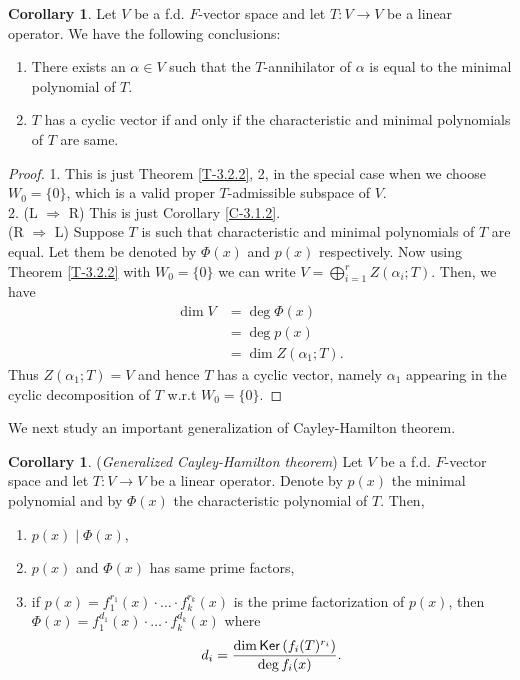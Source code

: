 \documentclass[letterpaper,11pt,twoside]{article}
\theoremstyle{definition}
\theoremstyle{definition}
\theoremstyle{definition}
\theoremstyle{definition}
\theoremstyle{definition}
\theoremstyle{definition}
\theoremstyle{remark}
\theoremstyle{definition}
\newtheorem{corollary}[proposition]{Corollary}
\newcommand{\Ker}[1]{{\fontfamily{lmss}\selectfont 
		\text{Ker}\left (#1\right )
}}
\begin{document}
	\begin{corollary}\label{C-3.2.4}
		Let $ V $ be a f.d. $ F$-vector space and let $ T: V\to V $ be a linear operator. We have the following conclusions:
		\begin{enumerate}
			\item {There exists an $ \alpha\in V $ such that the $ T $-annihilator of $ \alpha $ is equal to the minimal polynomial of $ T $.}
			\item {$ T $ has a cyclic vector if and only if the characteristic and minimal polynomials of $ T $ are same.}
		\end{enumerate}
	\end{corollary}
\begin{proof}
		1. This is just Theorem \ref{T-3.2.2}, 2, in the special case when we choose $ W_0 = \{0\} $, which is a valid proper $ T $-admissible subspace of $ V $.\\
		
		2. (L $ \Rightarrow $ R) This is just Corollary \ref{C-3.1.2}.\\
		(R $ \Rightarrow $ L) Suppose $ T $ is such that characteristic and minimal polynomials of $ T $ are equal. Let them be denoted by $ \Phi(x) $ and $ p(x) $ respectively. Now using Theorem \ref{T-3.2.2} with $ W_0 = \{0\} $ we can write $ V = \bigoplus_{i=1}^{r} Z(\alpha_i;T)  $. Then, we have
		\begin{align*}
			\dim V &= \deg \Phi(x)\\
			&= \deg p(x)\\
			&= \dim Z(\alpha_1;T).
		\end{align*}
		Thus $ Z(\alpha_1;T) = V $ and hence $ T $ has a cyclic vector, namely $ \alpha_1 $ appearing in the cyclic decomposition of $ T $ w.r.t $ W_0 = \{0\} $.
\end{proof}
	We next study an important generalization of Cayley-Hamilton theorem.
	\begin{corollary}\label{C-3.2.6}
		(\textit{Generalized Cayley-Hamilton theorem}) Let $ V $ be a f.d. $ F $-vector space and let $ T: V\to V $ be a linear operator. Denote by $ p(x) $ the minimal polynomial and by $ \Phi (x) $ the characteristic polynomial of $ T $. Then,
		\begin{enumerate}
			\item {$ p(x) \; | \; \Phi(x)$,}
			\item {$ p(x) $ and $ \Phi(x) $ has same prime factors,}
			\item {if $ p(x)  = f_1^{r_1}(x)\cdot \dots \cdot f_k^{r_k}(x)$ is the prime factorization of $ p(x) $, then $ \Phi(x) = f_{1}^{d_1}(x) \cdot \dots \cdot  f_{k}^{d_k}(x)$ where 
		\begin{align*}
			d_i = \dfrac{\dim\Ker{f_i(T)^{r_i}}}{\deg f_i(x)}.
		\end{align*}	
		}
		\end{enumerate}
	\end{corollary}
\end{document}
